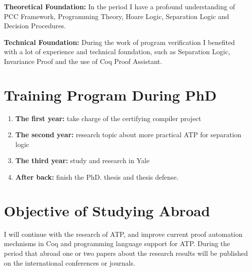 \documentclass{article}
\begin{document}
  \textbf{Theoretical Foundation:} In the period I have a profound understanding of PCC
  Framework, Programming Theory, Hoare Logic, Separation Logic and Decision Procedures. 
    
  \textbf{Technical Foundation:} During the work of program verification I benefited with
  a lot of experience and technical foundation, such as Separation Logic, Invariance Proof 
  and the use of Coq Proof Assistant.
\section{Training Program During PhD}
\label{sec-4}

\begin{enumerate}
\item \textbf{The first year:} take charge of the certifying compiler project
\item \textbf{The second year:} research topic about more practical ATP for separation logic
\item \textbf{The third year:} study and research in Yale
\item \textbf{After back:} finish the PhD. thesis and thesis defense.
\end{enumerate}
\section{Objective of Studying Abroad}
\label{sec-5}

  I will continue with the research of ATP, and improve current proof automation mechnisms in Coq and 
  programming language support for ATP. During the period that abroad one or two papers about the research results will be
  published on the international conferences or journals.
\end{document}

